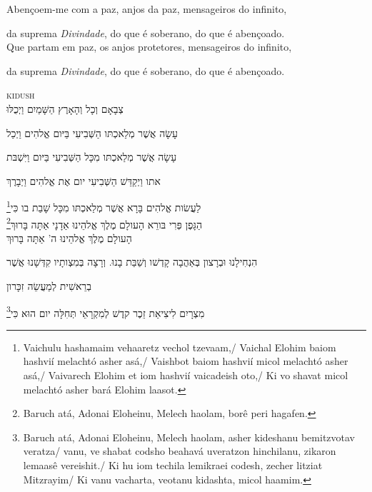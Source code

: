 Abençoem-me com a paz, anjos da paz, mensageiros do \qb{}infinito,

da suprema \emph{Divindade}, do que é soberano, do que é \qb{}abençoado.\\[10pt]

Que partam em paz, os anjos protetores, mensageiros do \qb{}infinito,

da suprema \emph{Divindade}, do que é soberano, do que é \qb{}abençoado.



\movetoevenpage
\raggedleft


\vspace*{1cm}

\textsc{kidush}\\[15pt]

צְבָאָם וְכָל וְהָאָרֶץ הַשָּׁמַיִם וַיְכֻלּוּ 

עָשָׂה אֲשֶׁר מְלַאכְתּו הַשְּׁבִיעִי בַּיּום אֱלהִים וַיְכַל 

עָשָׂה אֲשֶׁר מְלַאכְתּו מִכָּל הַשְּׁבִיעִי בַּיּום וַיִּשְׁבּת 

אתו וַיְקַדֵּשׁ הַשְּׁבִיעִי יום אֶת אֱלהִים וַיְבָרֶךְ 

לַעֲשׂות אֱלהִים בָּרָא אֲשֶׁר מְלַאכְתּו מִכָּל שָׁבַת בו כִּי\footnote{Vaichulu hashamaim vehaaretz vechol tzevaam,/
Vaichal Elohim baiom hashvií melachtó asher asá,/
Vaishbot baiom hashvií micol melachtó asher asá,/
Vaivarech Elohim et iom hashvií vaicadeish oto,/
Ki vo shavat micol melachtó asher bará Elohim laasot.}\\[10pt] 

הַגָּפֶן פְּרִי בּורֵא הָעולָם מֶלֶךְ אֱלהֵינוּ אַדָנָי אַתָּה בָּרוּךְ\footnote{Baruch atá, Adonai Eloheinu, Melech haolam, borê peri hagafen.}\\[10pt] 

הָעולָם מֶלֶךְ אֱלהֵינוּ ה' אַתָּה בָּרוּךְ

הִנְחִילָנוּ וּבְרָצון בְּאַהֲבָה קָדְשׁו וְשַׁבַּת בָנוּ. וְרָצָה בְּמִצְותָיו קִדְּשָׁנוּ אֲשֶׁר

בְרֵאשִׁית לְמַעֲשֵׂה זִכָּרון

מִצְרָיִם לִיצִיאַת זֵכֶר קדֶשׁ לְמִקְרָאֵי תְּחִלָּה יום הוּא כִּי\footnote{Baruch atá, Adonai Eloheinu, Melech haolam, asher kideshanu bemitzvotav veratza/
vanu, ve shabat codsho beahavá uveratzon hinchilanu, zikaron lemaasê vereishit./
Ki hu iom techila lemikraei codesh, zecher litziat Mitzrayim/ Ki vanu vacharta, veotanu kidashta, micol haamim.}\\[10pt]


